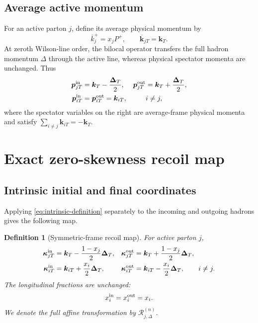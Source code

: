 \documentclass[11pt]{article}
\newtheorem{definition}{Definition}[section]
\newcommand{\kT}{\bm{k}_{T}}
\newcommand{\kiT}{\bm{k}_{iT}}
\newcommand{\DT}{\bm{\Delta}_{T}}
\newcommand{\cR}{\mathcal R}
\begin{document}
\subsection{Average active momentum}

For an active parton \(j\), define its average physical momentum by
\begin{equation}
 \bar k_j^+=x_jP^+,
 \qquad
 \overline{\bm k}_{jT}=\kT.
\label{eq:active-average}
\end{equation}
At zeroth Wilson-line order, the bilocal operator transfers the full hadron
momentum \(\Delta\) through the active line, whereas physical spectator
momenta are unchanged.  Thus
\begin{align}
 \bm p_{jT}^{\rm in}&=\kT-\frac{\DT}{2},
 &\bm p_{jT}^{\rm out}&=\kT+\frac{\DT}{2},
\label{eq:active-physical}\\
 \bm p_{iT}^{\rm in}&=\bm p_{iT}^{\rm out}
 =\kiT,
 &&i\ne j,
\label{eq:spectator-physical}
\end{align}
where the spectator variables on the right are average-frame physical
momenta and satisfy
\(\sum_{i\ne j}\kiT=-\kT\).

\section{Exact zero-skewness recoil map}
\label{sec:recoil}

\subsection{Intrinsic initial and final coordinates}

Applying \cref{eq:intrinsic-definition} separately to the incoming and
outgoing hadrons gives the following map.

\begin{definition}[Symmetric-frame recoil map]
\label{def:recoil-map}
For active parton \(j\),
\begin{align}
 \bm\kappa_{jT}^{\rm in}
 &=\kT-\frac{1-x_j}{2}\DT,
 &\bm\kappa_{jT}^{\rm out}
 &=\kT+\frac{1-x_j}{2}\DT,
\label{eq:active-recoil-map}\\
 \bm\kappa_{iT}^{\rm in}
 &=\kiT+\frac{x_i}{2}\DT,
 &\bm\kappa_{iT}^{\rm out}
 &=\kiT-\frac{x_i}{2}\DT,
 \qquad i\ne j.
\label{eq:spectator-recoil-map}
\end{align}
The longitudinal fractions are unchanged:
\begin{equation}
 x_i^{\rm in}=x_i^{\rm out}=x_i.
\label{eq:longitudinal-recoil}
\end{equation}
We denote the full affine transformation by
\(\cR_{j,\Delta}^{(n)}\).
\end{definition}
\end{document}
